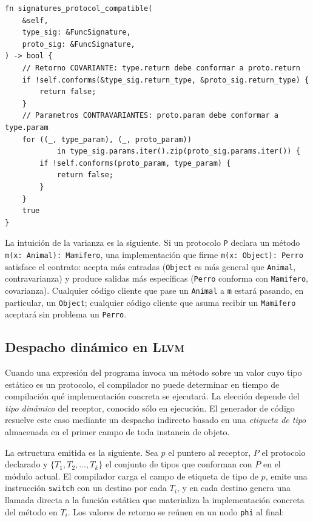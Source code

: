 \documentclass[11pt,a4paper,oneside,openany]{report}
\newcommand{\code}[1]{\texttt{#1}}
\newcommand{\llvm}{\textsc{Llvm}}
\begin{document}
\begin{lstlisting}[style=rustst, caption={Verificación de compatibilidad de firmas con varianza.}, label={lst:variance}]
fn signatures_protocol_compatible(
    &self,
    type_sig: &FuncSignature,
    proto_sig: &FuncSignature,
) -> bool {
    // Retorno COVARIANTE: type.return debe conformar a proto.return
    if !self.conforms(&type_sig.return_type, &proto_sig.return_type) {
        return false;
    }
    // Parametros CONTRAVARIANTES: proto.param debe conformar a type.param
    for ((_, type_param), (_, proto_param))
            in type_sig.params.iter().zip(proto_sig.params.iter()) {
        if !self.conforms(proto_param, type_param) {
            return false;
        }
    }
    true
}
\end{lstlisting}

La intuición de la varianza es la siguiente. Si un protocolo \code{P}
declara un método \code{m(x: Animal): Mamifero}, una implementación que
firme \code{m(x: Object): Perro} satisface el contrato: acepta más entradas
(\code{Object} es más general que \code{Animal}, contravarianza) y produce
salidas más específicas (\code{Perro} conforma con \code{Mamifero},
covarianza). Cualquier código cliente que pase un \code{Animal} a \code{m}
estará pasando, en particular, un \code{Object}; cualquier código cliente
que asuma recibir un \code{Mamifero} aceptará sin problema un \code{Perro}.

\subsection{Despacho dinámico en \llvm{}}

Cuando una expresión del programa invoca un método sobre un valor cuyo tipo
estático es un protocolo, el compilador no puede determinar en tiempo de
compilación qué implementación concreta se ejecutará. La elección depende
del \emph{tipo dinámico} del receptor, conocido sólo en ejecución. El
generador de código resuelve este caso mediante un despacho indirecto
basado en una \emph{etiqueta de tipo} almacenada en el primer campo de toda
instancia de objeto.

La estructura emitida es la siguiente. Sea $p$ el puntero al receptor, $P$
el protocolo declarado y $\{T_1, T_2, \ldots, T_k\}$ el conjunto de tipos
que conforman con $P$ en el módulo actual. El compilador carga el campo de
etiqueta de tipo de $p$, emite una instrucción \code{switch} con un destino
por cada $T_i$, y en cada destino genera una llamada directa a la función
estática que materializa la implementación concreta del método en $T_i$.
Los valores de retorno se reúnen en un nodo \texttt{phi} al final:
\end{document}
